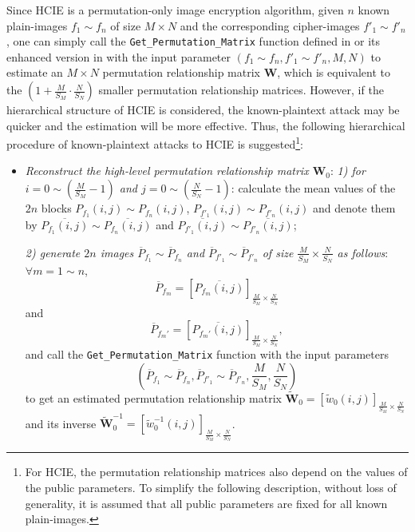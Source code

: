 \documentclass[final,3p,times,twocolumn]{elsarticle}
\begin{document}
Since HCIE is a permutation-only image encryption algorithm, given $n$ known
plain-images $f_1\sim f_n$ of size $M\times N$ and the
corresponding cipher-images $f'_1\sim f'_n$, one can simply call
the \texttt{Get\_Permutation\_Matrix} function defined in \cite[Sec.~3.1]{Li:Permutation:SPIC2008} or its enhanced version in
\cite[Sec.~4]{Lcq:Optimal:SP11} with the input parameter $(f_1\sim f_n,f'_1\sim f'_n, M, N)$ to estimate an
$M\times N$ permutation relationship matrix $\bm{W}$, which is equivalent to
the $\left(1+\frac{M}{S_M}\cdot\frac{N}{S_N}\right)$ smaller
permutation relationship matrices. However, if the hierarchical structure of
HCIE is considered, the known-plaintext attack may be quicker and
the estimation will be more effective. Thus, the following hierarchical procedure of
known-plaintext attacks to HCIE is suggested\footnote{For HCIE,
the permutation relationship matrices also depend on the values of the public
parameters. To simplify the following description, without loss of
generality, it is assumed that all public parameters are fixed for
all known plain-images.}:
\begin{itemize}
\item \textit{Reconstruct the high-level permutation relationship matrix
$\bm{W}_0$}: \textit{1)  for $i=0\sim\left(\frac{M}{S_M}-1\right)$ and
$j=0\sim\left(\frac{N}{S_N}-1\right)$}: calculate the mean values of the $2n$ blocks $P_{f_1}(i,j)\sim P_{f_n}(i,j)$,
$P_{f'_1}(i,j)\sim P_{f'_n}(i,j)$ and denote them by
$\overline{P_{f_1}(i,j)}\sim \overline{P_{f_n}(i,j)}$ and
$\overline{P_{f'_1}(i,j)}\sim \overline{P_{f'_n}(i,j)}$;

\textit{2) generate $2n$ images $\overline{P}_{f_1}\sim
\overline{P}_{f_n}$ and $\overline{P}_{f'_1}\sim
\overline{P}_{f'_n}$ of size $\frac{M}{S_M}\times\frac{N}{S_N}$ as
follows}: $\forall m=1\sim n$,
\begin{equation}
\overline{P}_{f_m}=\left[\overline{P_{f_m}(i,j)}\right]_{\frac{M}{S_M}\times\frac{N}{S_N}}
\label{equation:PlainBlock}
\end{equation}
and
\begin{equation}
\overline{P}_{f_m'}=\left[\overline{P_{f_m'}(i,j)}\right]_{\frac{M}{S_M}\times\frac{N}{S_N}},
\label{equation:CipherBlock}
\end{equation}
and call the \texttt{Get\_Permutation\_Matrix} function with the
input parameters
\[
\left(\overline{P}_{f_1}\sim \overline{P}_{f_n},
\overline{P}_{f'_1}\sim \overline{P}_{f'_n}, \frac{M}{S_M},
\frac{N}{S_N}\right)
\]
to get an estimated permutation relationship matrix
$\widetilde{\bm{W}}_0=\left[\widetilde{w}_0(i,j)\right]_{\frac{M}{S_M}\times\frac{N}{S_N}}$
and its inverse
$\widetilde{\bm{W}}_0^{-1}=\left[\widetilde{w}_0^{-1}(i,j)\right]_{\frac{M}{S_M}\times\frac{N}{S_N}}$.
\end{itemize}
\end{document}
